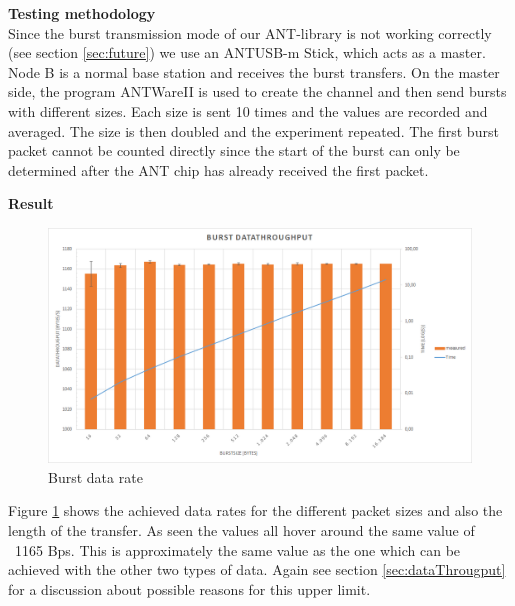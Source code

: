 \begin{description}
	\item{\textbf{Testing methodology}} \hfill \\ Since the burst transmission mode of our ANT-library is not working correctly (see section \ref{sec:future}) we use an ANTUSB-m Stick, which acts as a master. Node B is a normal base station and receives the burst transfers. On the master side, the program ANTWareII \cite{ANTwareII} is used to create the channel and then send bursts with different sizes. Each size is sent 10 times and the values are recorded and averaged. The size is then doubled and the experiment repeated. The first burst packet cannot be counted directly since the start of the burst can only be determined after the ANT chip has already received the first packet.
	\item{\textbf{Result}} \hfill \\ 
		\begin{figure}[H]
			\centering
			\includegraphics[scale=0.5]{./pics/exp5.png}
			\caption{Burst data rate}\label{fig:exp5}
		\end{figure}
	 Figure \ref{fig:exp5} shows the achieved data rates for the different packet sizes and also the length of the transfer. As seen the values all hover around the same value of ~1165 Bps. This is approximately the same value as the one which can be achieved with the other two types of data.
	 Again see section \ref{sec:dataThrougput} for a discussion about possible reasons for this upper limit. 
\end{description}
\newpage

